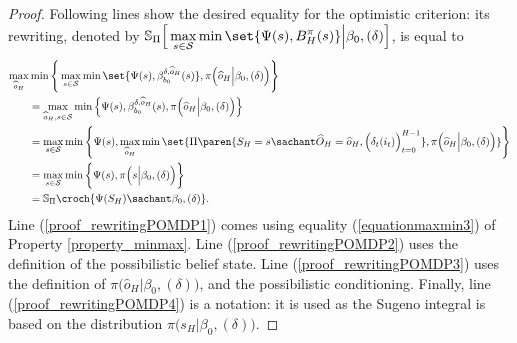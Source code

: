 \begin{proof}
Following lines show the desired equality for the optimistic criterion: 
its rewriting, denoted by
$\displaystyle \mathbb{S}_{\Pi} \Big[ \max_{s \in \mathcal{S}} \min \set{\Psi(s), B^{\pi}_H(s)} \Big\vert \beta_0, (\delta) \Big]$,
is equal to
\begin{align}
\nonumber \max_{\widehat{o}_H} & \min \Bigg\{ \max_{s \in \mathcal{S}} \min \set{\Psi(s), \beta^{\delta,\widehat{o}_H}_{b_0}(s)}, \pi \Big( \widehat{o}_H \Big\vert \beta_0, (\delta) \Big) \Bigg\}\\
\label{proof_rewritingPOMDP1} &= \max_{\widehat{o}_H,s\in\mathcal{S}} \min \Big\{ \Psi(s), \beta^{\delta,\widehat{o}_H}_{b_0}(s), \pi \Big( \widehat{o}_H \Big\vert \beta_0, (\delta)\Big) \Big\}\\
\label{proof_rewritingPOMDP2} &= \max_{s\in\mathcal{S}} \min \Bigg\{ \Psi(s), \max_{\widehat{o}_H} \min \set{ \Pi \paren{ S_H = s \sachant \widehat{O}_H = \widehat{o}_H , \Big(\delta_t(i_t)\Big)_{t=0}^{H-1} }, \pi \Big( \widehat{o}_H \Big\vert \beta_0, (\delta) \Big) } \Bigg\}\\
\label{proof_rewritingPOMDP3} &= \max_{s\in\mathcal{S}} \min \bigg\{ \Psi(s), \pi \Big( s \Big\vert \beta_0, (\delta) \Big)  \bigg\}\\
\label{proof_rewritingPOMDP4} &= \mathbb{S}_{\Pi} \croch{ \Psi(S_H) \sachant \beta_0,(\delta) }.
\end{align}
Line (\ref{proof_rewritingPOMDP1}) comes using equality (\ref{equationmaxmin3}) 
of Property \ref{property_minmax}. 
Line (\ref{proof_rewritingPOMDP2}) uses the definition of the possibilistic belief state.
Line (\ref{proof_rewritingPOMDP3}) uses the definition of $\pi \Big( \widehat{o}_H \Big\vert \beta_0, (\delta) \Big)$,
and the possibilistic conditioning.
Finally, line (\ref{proof_rewritingPOMDP4}) is a notation: 
it is used
as the Sugeno integral 
is based on the distribution $\pi \Big( s_H \Big\vert \beta_0, (\delta) \Big)$.


\end{proof}

